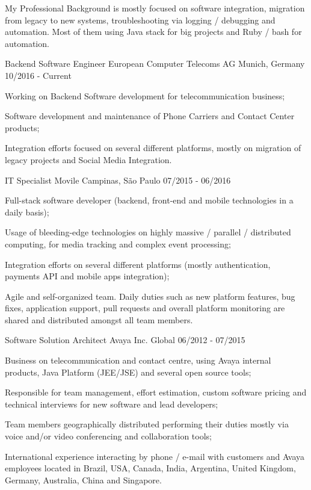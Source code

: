 
\begin{cvparagraph}
My Professional Background is mostly focused on software integration, migration from legacy to new systems, troubleshooting via logging / debugging and automation.
Most of them using Java stack for big projects and Ruby / bash for automation.
\end{cvparagraph}


\begin{cventries}

\cventry
{Backend Software Engineer}
{European Computer Telecoms AG}
{Munich, Germany}
{10/2016 - Current}
{
\begin{cvitems}
\item Working on Backend Software development for telecommunication business;
\item Software development and maintenance of Phone Carriers and Contact Center products;
\item Integration efforts focused on several different platforms, mostly on migration of legacy projects and Social Media Integration.
\end{cvitems}
}

\cventry
{IT Specialist}
{Movile}
{Campinas, São Paulo}
{07/2015 - 06/2016}
{
\begin{cvitems}
\item Full-stack software developer (backend, front-end and mobile technologies in a daily basis);
\item Usage of bleeding-edge technologies on highly massive / parallel / distributed computing, for media tracking and complex event processing;
\item Integration efforts on several different platforms (mostly authentication, payments API and mobile apps integration);
\item Agile and self-organized team. Daily duties such as new platform features, bug fixes, application support, pull requests and overall platform monitoring are shared and distributed amongst all team members.
\end{cvitems}
}

\cventry
{Software Solution Architect}
{Avaya Inc.}
{Global}
{06/2012 - 07/2015}
{
\begin{cvitems}
\item Business on telecommunication and contact centre, using Avaya internal products, Java Platform (JEE/JSE) and several open source tools;
\item Responsible for team management, effort estimation, custom software pricing and technical interviews for new software and lead developers;
\item Team members geographically distributed performing their duties mostly via voice and/or video conferencing and collaboration tools;
\item International experience interacting by phone / e-mail with customers and Avaya employees located in Brazil, USA, Canada, India, Argentina, United Kingdom, Germany, Australia, China and Singapore.
\end{cvitems}
}


\end{cventries}
